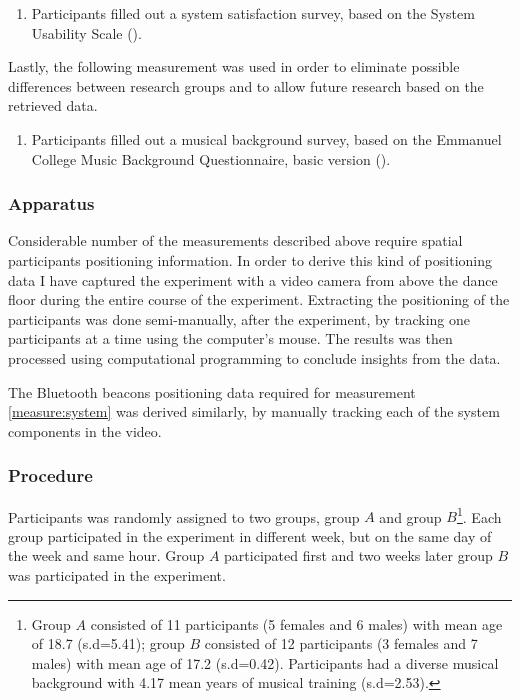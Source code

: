 \documentclass[a4paper,11pt]{article}
\begin{document}
{\begin{enumerate}[resume]
	\item \label{measure:survey:usability} Participants filled out a system satisfaction survey, based on the System Usability Scale (\cite{brooke96}).
\end{enumerate}
Lastly, the following measurement was used in order to eliminate possible differences between research groups and to allow future research based on the retrieved data.
\begin{enumerate}[resume]
	\item \label{measure:survey:musical} Participants filled out a musical background survey, based on the Emmanuel College Music Background Questionnaire, basic version (\cite{web:zhao12}).
\end{enumerate}

\subsubsection{Apparatus}\label{aparatus}

Considerable number of the measurements described above require spatial participants positioning information.
In order to derive this kind of positioning data I have captured the experiment with a video camera from above the dance floor during the entire course of the experiment.
Extracting the positioning of the participants was done semi-manually, after the experiment, by tracking one participants at a time using the computer's mouse.
The results was then processed using computational programming to conclude insights from the data.

The Bluetooth beacons positioning data required for measurement \ref{measure:system} was derived similarly, by manually tracking each of the system components in the video.

\subsubsection{Procedure}

Participants was randomly assigned to two groups, group $A$ and group $B$\@\footnote{Group $A$ consisted of 11 participants (5 females and 6 males) with mean age of 18.7 (s.d=5.41); group $B$ consisted of 12 participants (3 females and 7 males) with mean age of 17.2 (s.d=0.42). Participants had a diverse musical background with 4.17 mean years of musical training (s.d=2.53).}.
Each group participated in the experiment in different week, but on the same day of the week and same hour. Group $A$ participated first and two weeks later group $B$ was participated in the experiment.

}
\end{document}
